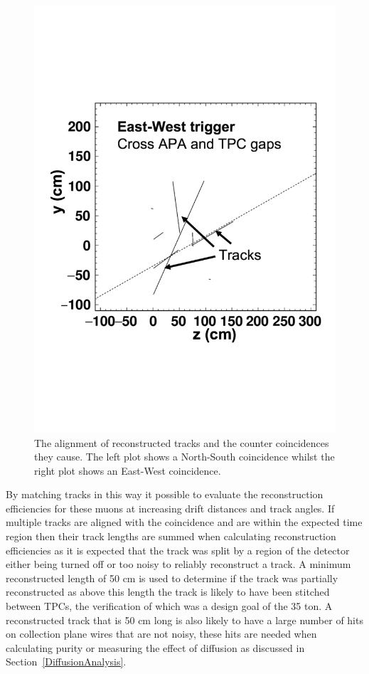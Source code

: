 \begin{figure}[h!]
\begin{minipage}{0.45\textwidth}
    \includegraphics[width=\textwidth]{East-West}
  \end{minipage}
  \caption[The alignment of tracks and counter coincidences]{The alignment of reconstructed tracks and the counter coincidences they cause. The left plot shows a North-South coincidence whilst the right plot shows an East-West coincidence.}
  \label{fig:CounterTrackAngle}
\end{figure}

By matching tracks in this way it possible to evaluate the reconstruction efficiencies for these muons at increasing drift distances and track angles. If multiple tracks are aligned with the coincidence and are within the expected time region then their track lengths are summed when calculating reconstruction efficiencies as it is expected that the track was split by a region of the detector either being turned off or too noisy to reliably reconstruct a track. A minimum reconstructed length of 50 cm is used to determine if the track was partially reconstructed as above this length the track is likely to have been stitched between TPCs, the verification of which was a design goal of the 35 ton. A reconstructed track that is 50 cm long is also likely to have a large number of hits on collection plane wires that are not noisy, these hits are needed when calculating purity or measuring the effect of diffusion as discussed in Section~\ref{DiffusionAnalysis}. \\

